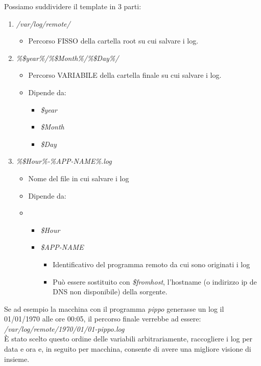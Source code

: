 \documentclass[../DocumentazioneProgetto.tex]{subfiles}
\begin{document}
Possiamo suddividere il template in 3 parti:
\begin{enumerate}
	\item \textit{/var/log/remote/}
	\begin{itemize}
		\item Percorso FISSO della cartella root su cui salvare i log.
	\end{itemize}
	\item \textit{\%\$year\%/\%\$Month\%/\%\$Day\%/}
	\begin{itemize}
		\item Percorso VARIABILE della cartella finale su cui salvare i log.
		\item Dipende da:
		\begin{itemize}
			\item \textit{\$year}
			\item \textit{\$Month}
			\item \textit{\$Day}
		\end{itemize}
	\end{itemize}
	\item \textit{\%\$Hour\%-\%APP-NAME\%.log}
	\begin{itemize}
		\item Nome del file in cui salvare i log
		\item Dipende da:
		\item \begin{itemize}
			\item \textit{\$Hour}
			\item \textit{\$APP-NAME}
			\begin{itemize}
				\item Identificativo del programma remoto da cui sono originati i log
				\item Può essere sostituito con \textit{\$fromhost}, l'hostname (o indirizzo ip de DNS non disponibile) della sorgente.
			\end{itemize}
		\end{itemize}
	\end{itemize}
\end{enumerate}
Se ad esempio la macchina con il programma \textit{pippo} generasse un log il 01/01/1970 alle ore 00:05, il percorso finale verrebbe ad essere:\\
\textit{\textit{/var/log/remote/1970/01/01-pippo.log}}\\
È stato scelto questo ordine delle variabili arbitrariamente, raccogliere i log per data e ora e, in seguito per macchina, consente di avere una migliore visione di insieme.\\
\end{document}
